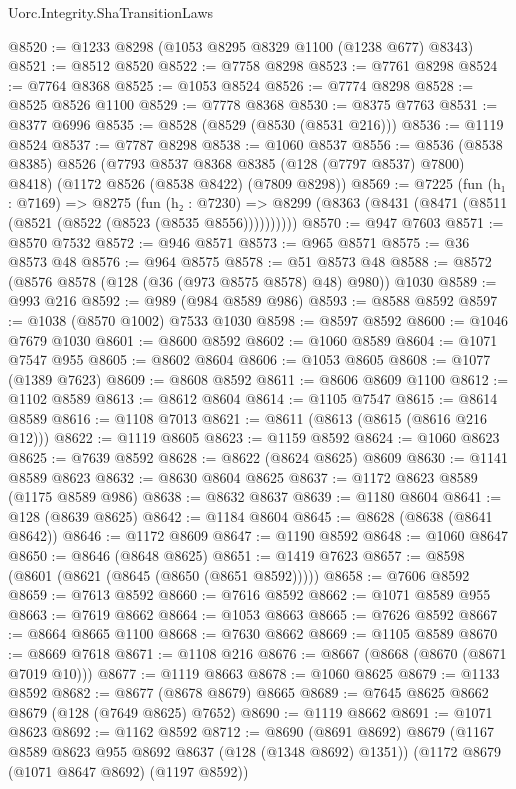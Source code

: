 \begin{lexlean}{Uorc.Integrity.ShaTransitionLaws}
\begin{coremodule}
@8520 := @1233 @8298 (@1053 @8295 @8329 @1100 (@1238 @677) @8343)
@8521 := @8512 @8520
@8522 := @7758 @8298
@8523 := @7761 @8298
@8524 := @7764 @8368
@8525 := @1053 @8524
@8526 := @7774 @8298
@8528 := @8525 @8526 @1100
@8529 := @7778 @8368
@8530 := @8375 @7763
@8531 := @8377 @6996
@8535 := @8528 (@8529 (@8530 (@8531 @216)))
@8536 := @1119 @8524
@8537 := @7787 @8298
@8538 := @1060 @8537
@8556 := @8536
    (@8538 @8385)
    @8526
    (@7793 @8537 @8368 @8385 (@128 (@7797 @8537) @7800) @8418)
    (@1172 @8526 (@8538 @8422) (@7809 @8298))
@8569 := @7225
    (fun (h₁ : @7169) =>
    @8275
      (fun (h₂ : @7230) =>
      @8299 (@8363 (@8431 (@8471 (@8511 (@8521 (@8522 (@8523 (@8535 @8556))))))))))
@8570 := @947 @7603
@8571 := @8570 @7532
@8572 := @946 @8571
@8573 := @965 @8571
@8575 := @36 @8573 @48
@8576 := @964 @8575
@8578 := @51 @8573 @48
@8588 := @8572 (@8576 @8578 (@128 (@36 (@973 @8575 @8578) @48) @980)) @1030
@8589 := @993 @216
@8592 := @989 (@984 @8589 @986)
@8593 := @8588 @8592
@8597 := @1038 (@8570 @1002) @7533 @1030
@8598 := @8597 @8592
@8600 := @1046 @7679 @1030
@8601 := @8600 @8592
@8602 := @1060 @8589
@8604 := @1071 @7547 @955
@8605 := @8602 @8604
@8606 := @1053 @8605
@8608 := @1077 (@1389 @7623)
@8609 := @8608 @8592
@8611 := @8606 @8609 @1100
@8612 := @1102 @8589
@8613 := @8612 @8604
@8614 := @1105 @7547
@8615 := @8614 @8589
@8616 := @1108 @7013
@8621 := @8611 (@8613 (@8615 (@8616 @216 @12)))
@8622 := @1119 @8605
@8623 := @1159 @8592
@8624 := @1060 @8623
@8625 := @7639 @8592
@8628 := @8622 (@8624 @8625) @8609
@8630 := @1141 @8589 @8623
@8632 := @8630 @8604 @8625
@8637 := @1172 @8623 @8589 (@1175 @8589 @986)
@8638 := @8632 @8637
@8639 := @1180 @8604
@8641 := @128 (@8639 @8625)
@8642 := @1184 @8604
@8645 := @8628 (@8638 (@8641 @8642))
@8646 := @1172 @8609
@8647 := @1190 @8592
@8648 := @1060 @8647
@8650 := @8646 (@8648 @8625)
@8651 := @1419 @7623
@8657 := @8598 (@8601 (@8621 (@8645 (@8650 (@8651 @8592)))))
@8658 := @7606 @8592
@8659 := @7613 @8592
@8660 := @7616 @8592
@8662 := @1071 @8589 @955
@8663 := @7619 @8662
@8664 := @1053 @8663
@8665 := @7626 @8592
@8667 := @8664 @8665 @1100
@8668 := @7630 @8662
@8669 := @1105 @8589
@8670 := @8669 @7618
@8671 := @1108 @216
@8676 := @8667 (@8668 (@8670 (@8671 @7019 @10)))
@8677 := @1119 @8663
@8678 := @1060 @8625
@8679 := @1133 @8592
@8682 := @8677 (@8678 @8679) @8665
@8689 := @7645 @8625 @8662 @8679 (@128 (@7649 @8625) @7652)
@8690 := @1119 @8662
@8691 := @1071 @8623
@8692 := @1162 @8592
@8712 := @8690
    (@8691 @8692)
    @8679
    (@1167 @8589 @8623 @955 @8692 @8637 (@128 (@1348 @8692) @1351))
    (@1172 @8679 (@1071 @8647 @8692) (@1197 @8592))

\end{coremodule}
\end{lexlean}
